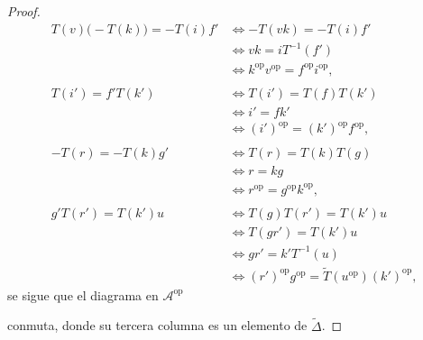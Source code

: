 \documentclass[tesis]{subfiles}
\begin{document}
\begin{proof}
    \begin{align*}
        T(v)\big(-T(k)\big) = -T(i)f' &\iff -T(vk) = -T(i)f' \\
                                      &\iff vk = i T^{-1}(f') \\
                                      &\iff k^\text{op}v^\text{op} = f^\text{op}i^\text{op}, \\ \\
            T(i') = f'T(k') &\iff T(i') = T(f)T(k') \\
                            &\iff i' = fk' \\
                            &\iff (i')^\text{op} = (k')^\text{op}f^\text{op}, \\ \\
                -T(r) = -T(k)g' &\iff T(r) = T(k)T(g) \\
                                &\iff r = kg \\
                                &\iff r^\text{op} = g^\text{op}k^\text{op}, \\ \\
                    g'T(r') = T(k')u &\iff T(g)T(r') = T(k')u \\
                                     &\iff T(gr') = T(k')u \\
                                     &\iff gr' = k'T^{-1}(u) \\
                                     &\iff (r')^\text{op} g^\text{op} = \tilde{T}(u^\text{op})(k')^\text{op},
    \end{align*}
    se sigue que el diagrama en $\mathscr{A}^\text{op}$
    \begin{center}
    \end{center}
    conmuta, donde su tercera columna es un elemento de $\tilde{\Delta}$.
\end{proof}
\end{document}
